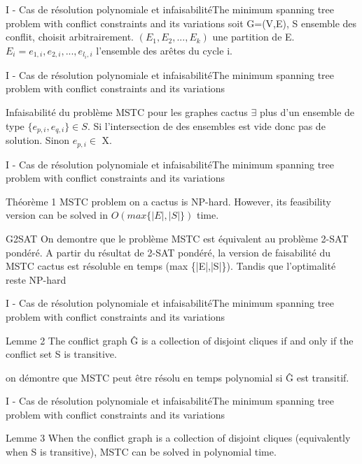 \documentclass[14pt,aspectratio=169]{beamer}
\newcommand{\TT}{The minimum spanning tree problem with conflict constraints and its variations}
\newcommand{\PI}{I - Cas de résolution polynomiale et infaisabilité}
\begin{document}
\begin{frame}{\PI}{\TT}
 soit G=(V,E), \pause
 S ensemble des conflit, choisit arbitrairement.
 $(E_{1}, E_{2}, ..., E_{k})$ une partition de E.
 \newline $E_{i}={e_{1,i}, e_{2,i},..., e_{l_{i},i}}$ l'ensemble des arêtes du cycle i.
\end{frame}

\begin{frame}{\PI}{\TT}
 \begin{block}{Infaisabilité du problème MSTC pour les graphes cactus}
 $\exists$ plus d'un ensemble de type $\{e_{p,i}, e_{q,i}\} \in S$.
 \newline Si l'intersection de des ensembles est vide donc pas de solution.
 \newline Sinon $e_{p,i} \in$ X.
 \end{block}
\end{frame}

\begin{frame}{\PI}{\TT}
\begin{block}{Théorème 1}
 MSTC problem on a cactus is NP-hard. However, its feasibility version can be solved in $ O ( max \{| E |, | S |\})$ time.
 \end{block}
 \begin{block}{G2SAT}
 On demontre que le problème MSTC est équivalent au problème 2-SAT pondéré. 
 \newline
 A partir du résultat de 2-SAT pondéré, la version de faisabilité du MSTC cactus est résoluble en temps (max \{|E|,|S|\}). Tandis que l'optimalité reste NP-hard
 \end{block}
\end{frame}


\begin{frame}{\PI}{\TT}
 \begin{block}{Lemme 2}
The conflict graph Ĝ is a collection of disjoint cliques if and only if the conflict set S is transitive.
 \end{block}
 
 on démontre que MSTC peut être résolu en temps polynomial si Ĝ est transitif.
\end{frame}

\begin{frame}{\PI}{\TT}
 \begin{block}{Lemme 3}
 When the conflict graph is a collection of disjoint cliques (equivalently when S is transitive), MSTC can be solved in polynomial time.
 \end{block}
\end{frame}
\end{document}
